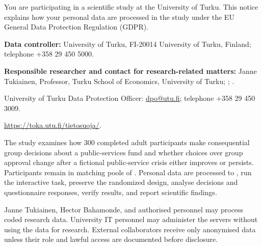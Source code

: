 


You are participating in a scientific study at the University of Turku. This notice explains how your personal data are processed in the study \emph{\StudyTitle} under the EU General Data Protection Regulation (GDPR).

\textbf{Data controller:} University of Turku, FI-20014 University of Turku, Finland; telephone +358 29 450 5000.

\textbf{Responsible researcher and contact for research-related matters:} Janne Tukiainen, Professor, Turku School of Economics, University of Turku; \StudyEmail; \StudyPhone.

University of Turku Data Protection Officer: \href{mailto:dpo@utu.fi}{dpo@utu.fi}; telephone +358 29 450 3009.

\url{https://toka.utu.fi/tietosuoja/}.

The study examines how 300 completed adult participants make consequential group decisions about a public-services fund and whether choices over group approval change after a fictional public-service crisis either improves or persists. Participants remain in matching pools of . Personal data are processed to , run the interactive task, preserve the randomized design, analyse decisions and questionnaire responses, verify results, and report scientific findings. 

Janne Tukiainen, Hector Bahamonde, and authorised personnel may process coded research data.  University IT personnel may administer the servers without using the data for research. External collaborators receive only anonymised data unless their role and lawful access are documented before disclosure.

